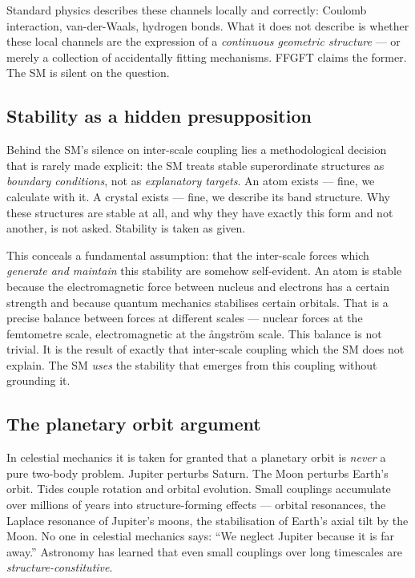 Standard physics describes these channels locally and correctly:
Coulomb interaction, van-der-Waals, hydrogen bonds. What it does not
describe is whether these local channels are the expression of a
\emph{continuous geometric structure} --- or merely a collection of
accidentally fitting mechanisms. FFGFT claims the former. The SM is
silent on the question.

\subsection*{Stability as a hidden presupposition}

Behind the SM's silence on inter-scale coupling lies a methodological
decision that is rarely made explicit: the SM treats stable
superordinate structures as \emph{boundary conditions}, not as
\emph{explanatory targets}. An atom exists --- fine, we calculate with
it. A crystal exists --- fine, we describe its band structure. Why
these structures are stable at all, and why they have exactly this
form and not another, is not asked. Stability is taken as given.

This conceals a fundamental assumption: that the inter-scale forces
which \emph{generate and maintain} this stability are somehow
self-evident. An atom is stable because the electromagnetic force
between nucleus and electrons has a certain strength and because
quantum mechanics stabilises certain orbitals. That is a precise
balance between forces at different scales --- nuclear forces at the
femtometre scale, electromagnetic at the ångström scale. This balance
is not trivial. It is the result of exactly that inter-scale coupling
which the SM does not explain. The SM \emph{uses} the stability that
emerges from this coupling without grounding it.

\subsection*{The planetary orbit argument}

In celestial mechanics it is taken for granted that a planetary orbit
is \emph{never} a pure two-body problem. Jupiter perturbs Saturn. The
Moon perturbs Earth's orbit. Tides couple rotation and orbital
evolution. Small couplings accumulate over millions of years into
structure-forming effects --- orbital resonances, the Laplace resonance
of Jupiter's moons, the stabilisation of Earth's axial tilt by the
Moon. No one in celestial mechanics says: ``We neglect Jupiter because
it is far away.'' Astronomy has learned that even small couplings over
long timescales are \emph{structure-constitutive}.

